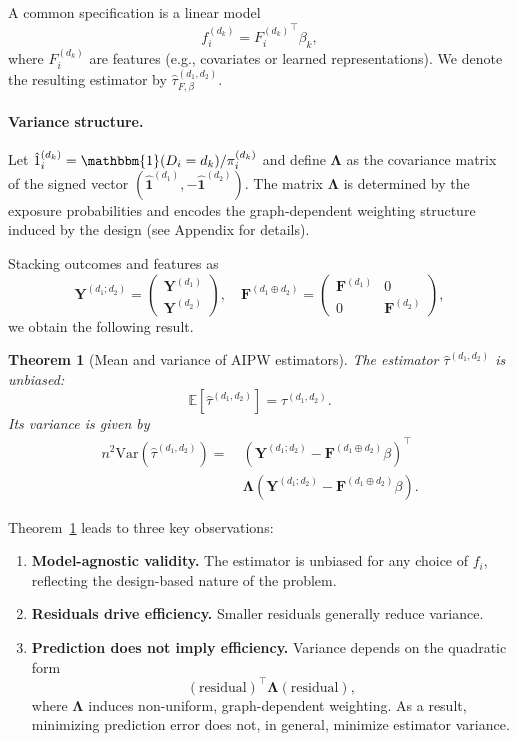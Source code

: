 \documentclass[twoside]{article}
\theoremstyle{plain}
\newtheorem{theorem}{Theorem}[section]
\theoremstyle{definition}
\theoremstyle{remark}
\newcommand{\E}{\mathbb{E}}
\newcommand{\Var}{\mathrm{Var}}
\newcommand{\bY}{\boldsymbol{Y}}
\newcommand{\bF}{\boldsymbol{F}}
\newcommand{\bLambda}{\boldsymbol{\Lambda}}
\newcommand{\indicator}{\mathbbm{1}}
\newcommand{\bOne}{\boldsymbol{1}}
\newcommand{\bFaug}{\bF^{(d_1\oplus d_2)}}
\begin{document}
A common specification is a linear model
\[
f_i^{(d_k)} = {F_i^{(d_k)}}^\top \beta_k,
\]
where $F_i^{(d_k)}$ are features (e.g., covariates or learned representations). We denote the resulting estimator by $\hat\tau^{(d_1,d_2)}_{F,\beta}$.

\paragraph{Variance structure.}
Let $\hat{1}_i^{(d_k)} = \indicator(D_i=d_k)/\pi_i^{(d_k)}$ and define $\bLambda$ as the covariance matrix of the signed vector $(\hat{\bOne}^{(d_1)}, -\hat{\bOne}^{(d_2)})$. The matrix $\bLambda$ is determined by the exposure probabilities and encodes the graph-dependent weighting structure induced by the design (see Appendix for details).

Stacking outcomes and features as
\[
\bY^{(d_1;d_2)} =
\begin{pmatrix}
\bY^{(d_1)} \\
\bY^{(d_2)}
\end{pmatrix}, \quad
\bFaug =
\begin{pmatrix}
\bF^{(d_1)} & 0 \\
0 & \bF^{(d_2)}
\end{pmatrix},
\]
we obtain the following result.

\begin{theorem}[Mean and variance of AIPW estimators]\label{thm:mean_variance}
The estimator $\hat\tau^{(d_1,d_2)}$ is unbiased:
\[
\E[\hat\tau^{(d_1,d_2)}] = \tau^{(d_1,d_2)}.
\]
Its variance is given by
\begin{align*}
n^2 \Var(\hat\tau^{(d_1,d_2)}) =\ &
(\bY^{(d_1;d_2)} - \bFaug \beta)^\top \\
&\bLambda
(\bY^{(d_1;d_2)} - \bFaug \beta).
\end{align*}
\end{theorem}

Theorem~\ref{thm:mean_variance} leads to three key observations:

\begin{enumerate}[label=(\roman*)]
\item \textbf{Model-agnostic validity.} The estimator is unbiased for any choice of $f_i$, reflecting the design-based nature of the problem.

\item \textbf{Residuals drive efficiency.} Smaller residuals generally reduce variance.

\item \textbf{Prediction does not imply efficiency.} Variance depends on the quadratic form
\[
(\text{residual})^\top \bLambda (\text{residual}),
\]
where $\bLambda$ induces non-uniform, graph-dependent weighting. As a result, minimizing prediction error does not, in general, minimize estimator variance.
\end{enumerate}
\end{document}
